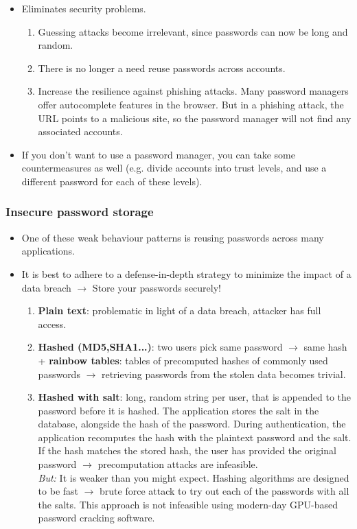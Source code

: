 \documentclass[../main.tex]{subfiles}
\begin{document}
\begin{itemize}
\item Eliminates security problems.
\begin{enumerate}
\item Guessing attacks become irrelevant, since passwords can now be long and random.
\item There is no longer a need reuse passwords across accounts.
\item Increase the resilience against phishing attacks. Many password managers offer autocomplete features in the browser. But in a phishing attack, the URL points to a malicious site, so the password manager will not find any associated accounts.
\end{enumerate}
\item If you don't want to use a password manager, you can take some countermeasures as well (e.g. divide accounts into trust levels, and use a different password for each of these levels).
\end{itemize}

\subsubsection{Insecure password storage}
\begin{itemize}
\item One of these weak behaviour patterns is reusing passwords across many applications.
\item It is best to adhere to a defense-in-depth strategy to minimize the impact of a data breach $\rightarrow$ Store your passwords securely!
\begin{enumerate}
\item \textbf{Plain text}: problematic in light of a data breach, attacker has full access. 
\item \textbf{Hashed (MD5,SHA1...)}: two users pick same password $\rightarrow$ same hash + \textbf{rainbow tables}: tables of precomputed hashes of commonly used passwords $\rightarrow$ retrieving passwords from the stolen data becomes trivial.
\item \textbf{Hashed with salt}: long, random string per user, that is appended to the password before it is hashed. The application stores the salt in the database, alongside the hash of the password. During authentication, the application recomputes the hash with the plaintext password and the salt. If the hash matches the stored hash, the user has provided the original password $\rightarrow$ precomputation attacks are infeasible.\\
\emph{But:} It is weaker than you might expect. Hashing algorithms are designed to be fast $\rightarrow$ brute force attack to try out each of the passwords with all the salts. This approach is not infeasible using modern-day GPU-based password cracking software.
\end{enumerate}
\end{itemize}
\end{document}
